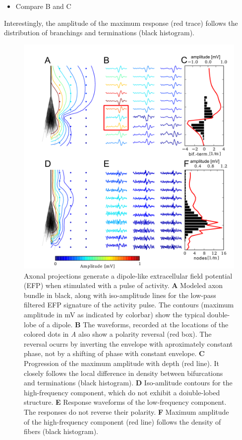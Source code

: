 \documentclass[]{article}
\providecommand{\tightlist}{%
  \setlength{\itemsep}{0pt}\setlength{\parskip}{0pt}}
\begin{document}
\begin{itemize}
\tightlist
\item
  Compare B and C
\end{itemize}

Interestingly, the amplitude of the maximum response (red trace) follows
the distribution of branchings and terminations (black histogram).

\begin{figure}[htbp]
\centering
\includegraphics{../figs/fig_1.pdf}
\caption{Axonal projections generate a dipole-like extracellular field
potential (EFP) when stimulated with a pulse of activity. \textbf{A}
Modeled axon bundle in black, along with iso-amplitude lines for the
low-pass filtered EFP signature of the activity pulse. The contours
(maximum amplitude in mV as indicated by colorbar) show the typical
double-lobe of a dipole. \textbf{B} The waveforms, recorded at the
locations of the colored dots in \emph{A} also show a polarity reversal
(red box). The reversal ocurrs by inverting the envelope with
aproximately constant phase, not by a shifting of phase with constant
envelope. \textbf{C} Progression of the maximum amplitude with depth
(red line). It closely follows the local difference in density between
bifurcations and terminations (black histogram). \textbf{D} Iso-amlitude
contours for the high-frequency component, which do not exhibit a
doiuble-lobed structure. \textbf{E} Response waveforms of the
low-frequency component. The responses do not reverse their polarity.
\textbf{F} Maximum amplitude of the high-frequency component (red line)
follows the density of fibers (black histogram).}
\end{figure}
\end{document}
